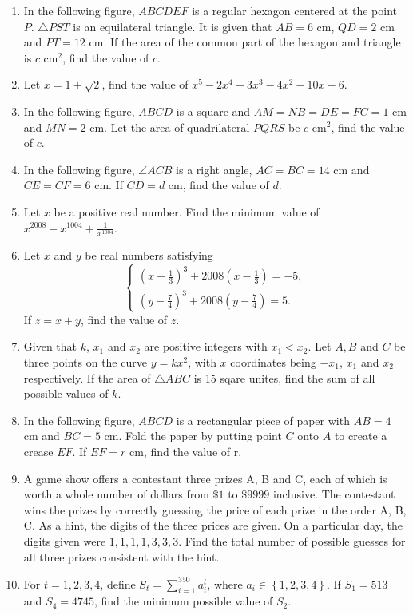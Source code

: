 \documentclass{article}
\begin{document}
\begin{enumerate}
    \item In the following figure, $ABCDEF$ is a regular hexagon centered at the point $P$. $\triangle PST$ is an equilateral triangle. It is given that $AB=6$ cm, $QD=2$ cm and $PT=12$ cm. If the area of the common part of the hexagon and triangle is $c$ cm$^2$, find the value of $c$.
    \item Let $x=1+\sqrt{2}$, find the value of $x^{5}-2x^{4}+3x^{3}-4x^{2}-10x-6$.
    \item In the following figure, $ABCD$ is a square and $AM=NB=DE=FC=1$ cm and $MN=2$ cm. Let the area of quadrilateral $PQRS$ be $c$ cm$^2$, find the value of $c$.
    \item In the following figure, $\angle ACB$ is a right angle, $AC=BC=14$ cm and $CE=CF=6$ cm. If $CD=d$ cm, find the value of $d$.
    \item Let $x$ be a positive real number. Find the minimum value of $\displaystyle x^{2008}-x^{1004}+\frac{1}{x^{1004}}$.
    \item Let $x$ and $y$ be real numbers satisfying
        \begin{equation*}
            \begin{cases}
                \left(x-\frac{1}{3}\right)^{3}+2008\left(x-\frac{1}{3}\right)=-5,\\
                \left(y-\frac{7}{4}\right)^{3}+2008\left(y-\frac{7}{4}\right)=5.
            \end{cases}
        \end{equation*}
        If $z=x+y$, find the value of $z$.
    \item Given that $k$, $x_{1}$ and $x_{2}$ are positive integers with $x_{1}<x_{2}$. Let $A,B$ and $C$ be three points on the curve $y=kx^2$, with $x$ coordinates being $-x_{1}$, $x_{1}$ and $x_{2}$ respectively. If the area of $\triangle ABC$ is 15 sqare unites, find the sum of all possible values of $k$.
    \item In the following figure, $ABCD$ is a rectangular piece of paper with $AB=4$ cm and $BC=5$ cm. Fold the paper by putting point $C$ onto $A$ to create a crease $EF$. If $EF=r$ cm, find the value of r.
    \item A game show offers a contestant three prizes A, B and C, each of which is worth a whole number of dollars from $\$ 1$ to $\$ 9999$ inclusive. The contestant wins the prizes by correctly guessing the price of each prize in the order A, B, C. As a hint, the digits of the three prices are given. On a particular day, the digits given were $1,1,1,1,3,3,3$. Find the total number of possible guesses for all three prizes consistent with the hint.
    \item For $t=1,2,3,4$, define $\displaystyle S_{t}=\sum_{i=1}^{350}a_i^t$, where $a_i\in \left\{1,2,3,4\right\}$. If $S_1=513$ and $S_4=4745$, find the minimum possible value of $S_{2}$.
\end{enumerate}
\end{document}
